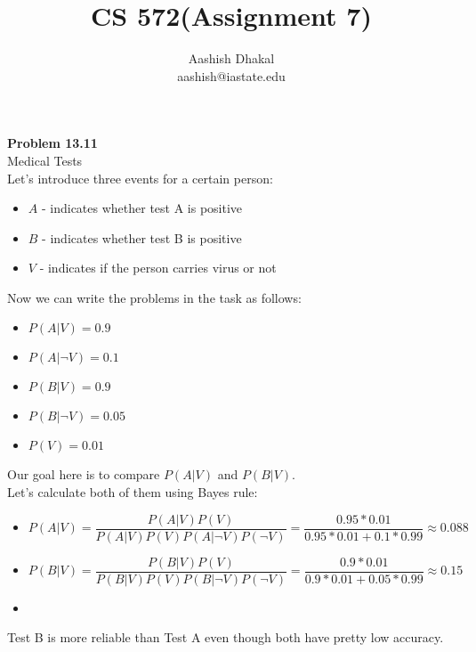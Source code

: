 \documentclass[11pt]{article}
\begin{document}
\title{CS 572(Assignment 7)} %
\author{Aashish Dhakal\\ %
aashish@iastate.edu\\%
 }      %
\date{}


\maketitle
\section*{}

\textbf{Problem 13.11}\\
Medical Tests\\
Let's introduce three events for a certain person:
\begin{itemize}
  \item $A$ - indicates whether test A is positive
  \item $B$ - indicates whether test B is positive
  \item $V$ - indicates if the person carries virus or not
\end{itemize}
 Now we can write the problems in the task as follows:
\begin{itemize}
  \item $P(A|V) = 0.9$
  \item $P(A|\neg V) = 0.1$
  \item $P(B|V) = 0.9$
  \item $P(B|\neg V) = 0.05$
  \item $P(V) = 0.01$
\end{itemize}
Our goal here is to compare $P(A|V)$ and $P(B|V)$. \\
Let's calculate both of them using Bayes rule:
\begin{itemize}
  \item \[ P(A|V)=\frac{P(A|V)P(V)}{P(A|V)P(V)P(A|\neg V)P(\neg V)}=\frac{0.95*0.01}{0.95*0.01+0.1*0.99} \approx 0.088 \]
  \item \[ P(B|V)=\frac{P(B|V)P(V)}{P(B|V)P(V)P(B|\neg V)P(\neg V)}=\frac{0.9*0.01}{0.9*0.01+0.05*0.99} \approx 0.15 \]  \item
\end{itemize}

Test B is more reliable than Test A even though both have pretty low accuracy.
\end{document}
